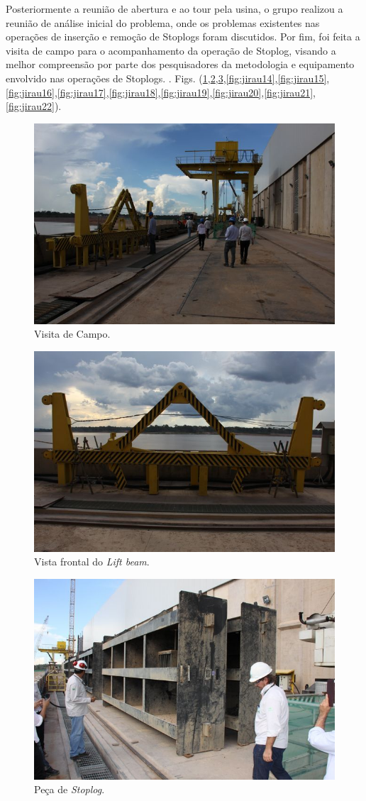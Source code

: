 \clearpage

Posteriormente a reunião de abertura e ao tour pela usina, 
o grupo realizou a reunião de análise inicial do problema, onde os problemas
existentes nas operações de inserção e remoção de Stoplogs foram discutidos. 
Por fim, foi feita a visita de campo para o acompanhamento da operação de
Stoplog, visando a melhor compreensão por parte dos pesquisadores da metodologia e equipamento envolvido nas operações de Stoplogs. . Figs.
(\ref{fig:jirau9},\ref{fig:jirau11},\ref{fig:jirau13},\ref{fig:jirau14},\ref{fig:jirau15},\ref{fig:jirau16},\ref{fig:jirau17},\ref{fig:jirau18},\ref{fig:jirau19},\ref{fig:jirau20},\ref{fig:jirau21},\ref{fig:jirau22}).


\begin{figure}[h!]
    \centering \includegraphics[width=0.6\columnwidth]{figs/jirau/jirau_09}
    \caption{Visita de Campo.}
    \label{fig:jirau9}
\end{figure}

\begin{figure}[h!]
    \centering \includegraphics[width=0.6\columnwidth]{figs/jirau/jirau_11}
    \caption{Vista frontal do \emph{Lift beam}.}
    \label{fig:jirau11}
\end{figure}

\begin{figure}[h!]
    \centering \includegraphics[width=0.6\columnwidth]{figs/jirau/jirau_13}
    \caption{Peça de \emph{Stoplog}.}
    \label{fig:jirau13}
\end{figure}

